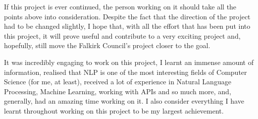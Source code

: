 If this project is ever continued, the person working on it should take all the points above into consideration. Despite the fact that the direction of the project had to be changed slightly, I hope that, with all the effort that has been put into this project, it will prove useful and contribute to a very exciting project and, hopefully, still move the Falkirk Council's project closer to the goal. 

It was incredibly engaging to work on this project, I learnt an immense amount of information, realised that NLP is one of the most interesting fields of Computer Science (for me, at least), received a lot of experience in Natural Language Processing, Machine Learning, working with APIs and so much more, and, generally, had an amazing time working on it. I also consider everything I have learnt throughout working on this project to be my largest achievement. 